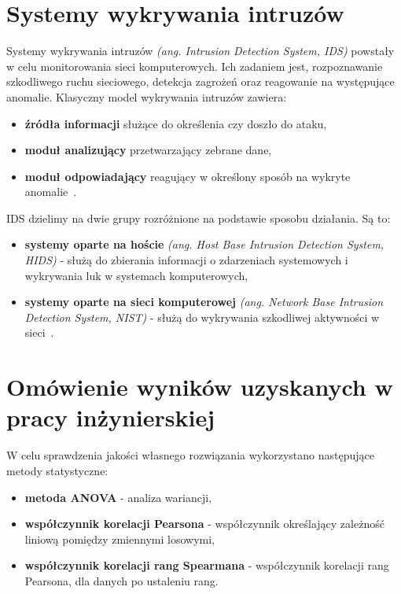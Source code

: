 \section{Systemy wykrywania intruzów}
Systemy wykrywania intruzów \textit{(ang. Intrusion Detection System, IDS)} powstały w celu monitorowania sieci komputerowych. Ich zadaniem jest, rozpoznawanie szkodliwego ruchu sieciowego, detekcja zagrożeń oraz reagowanie na występujące anomalie. Klasyczny model wykrywania intruzów zawiera:
\begin{itemize}
\item \textbf{źródła informacji} służące do określenia czy doszło do ataku,
\item \textbf{moduł analizujący} przetwarzający zebrane dane,
\item \textbf{moduł odpowiadający} reagujący w określony sposób na wykryte anomalie~\cite{SazzadulHoque2012, Bacer, Blyszcz2022}.
\end{itemize}
IDS dzielimy na dwie grupy rozróżnione na podstawie sposobu działania. Są to:
\begin{itemize}
    \item \textbf{systemy oparte na hoście} \textit{(ang. Host Base Intrusion Detection System, HIDS)} - służą do zbierania informacji o zdarzeniach systemowych i wykrywania luk w systemach komputerowych,
    \item \textbf{systemy oparte na sieci komputerowej} \textit{(ang. Network Base Intrusion Detection System, NIST)} - służą do wykrywania szkodliwej aktywności w sieci~\cite{Blyszcz2022, SazzadulHoque2012, chawlaashima}.
\end{itemize}


\section{Omówienie  wyników uzyskanych w pracy inżynierskiej}
W celu sprawdzenia jakości własnego rozwiązania wykorzystano następujące metody statystyczne:

\begin{itemize}
    \item \textbf{metoda ANOVA} - analiza wariancji,
    \item \textbf{współczynnik korelacji Pearsona} - współczynnik określający zależność liniową pomiędzy zmiennymi losowymi,
    \item \textbf{współczynnik korelacji rang Spearmana} - współczynnik korelacji rang Pearsona, dla danych po ustaleniu rang.
\end{itemize}

